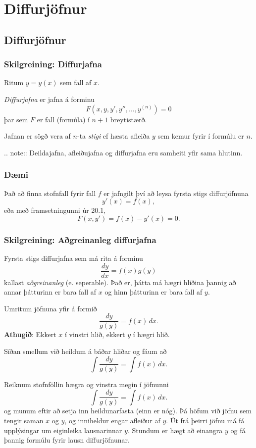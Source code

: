 \documentclass[icelandic,a4paper,12pt]{article}
\date{29. ágúst 2015}
\begin{document}
\setcounter{tocdepth}{2}
\tableofcontents

\section{Diffurjöfnur}
\subsection{Diffurjöfnur}
\subsubsection{Skilgreining: Diffurjafna}  
Ritum $y=y(x)$ sem fall af $x$. 

\emph{Diffurjafna} er jafna á forminu 
$$F(x, y, y', y'', \ldots, y^{(n)})=0$$
þar sem $F$ er fall (formúla) í $n+1$ breytistærð.  

Jafnan er sögð vera af $n$-ta \emph{stigi} ef hæsta afleiða $y$ sem kemur fyrir í
formúlu er $n$.

.. note::
   Deildajafna, afleiðujafna og diffurjafna eru samheiti yfir sama hlutinn. 

\subsubsection{Dæmi}
Það að finna stofnfall fyrir fall $f$ er jafngilt því að leysa 
fyrsta stigs diffurjöfnuna 
$$
y'(x) = f(x),
$$
eða með framsetningunni úr 20.1,
$$
F(x,y') = f(x) - y'(x) = 0.
$$

\subsubsection{Skilgreining: Aðgreinanleg diffurjafna} 
Fyrsta stigs diffurjafna sem má rita á forminu 
$$\frac{dy}{dx}=f(x)g(y)$$ 
kallast \emph{aðgreinanleg} (e. seperable).  
Það er, þátta má hægri hliðina  þannig að annar þátturinn
er bara fall af $x$ og hinn þátturinn er bara fall af $y$.

Umritum jöfnuna yfir á formið $$\frac{dy}{g(y)}=f(x)\,dx.$$ 
\textbf{Athugið}: Ekkert $x$ í vinstri hlið, ekkert $y$ í hægri hlið. 

Síðan smellum við heildum á báðar hliðar og fáum að 
$$\int\frac{dy}{g(y)}=\int f(x)\,dx.$$
 
Reiknum stofnföllin hægra og vinstra megin í jöfnunni
$$\int\frac{dy}{g(y)}=\int f(x)\,dx.$$
og munum eftir að setja inn heildunarfasta (einn er nóg).  
Þá höfum við jöfnu sem tengir saman $x$ og $y$, og inniheldur engar afleiður af $y$. 
Út frá þeirri jöfnu má fá upplýsingar um eiginleika lausnarinnar $y$.  
Stundum er hægt að einangra $y$ og fá þannig formúlu fyrir lausn diffurjöfnunar.
\end{document}
